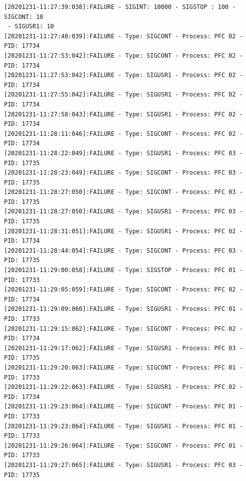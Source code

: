 \documentclass[11pt, oneside]{article}   	%
\begin{document}
\begin{Verbatim}[frame=topline,
			framesep=4mm,
			label=\fbox{\Large{FAILURE\_20201231.log}}]
[20201231-11:27:39:038]:FAILURE - SIGINT: 10000 - SIGSTOP : 100 - SIGCONT: 10
 - SIGUSR1: 10
[20201231-11:27:40:039]:FAILURE - Type: SIGCONT - Process: PFC 02 - PID: 17734
[20201231-11:27:53:042]:FAILURE - Type: SIGCONT - Process: PFC 02 - PID: 17734
[20201231-11:27:53:042]:FAILURE - Type: SIGUSR1 - Process: PFC 02 - PID: 17734
[20201231-11:27:55:042]:FAILURE - Type: SIGUSR1 - Process: PFC 02 - PID: 17734
[20201231-11:27:58:043]:FAILURE - Type: SIGUSR1 - Process: PFC 02 - PID: 17734
[20201231-11:28:11:046]:FAILURE - Type: SIGCONT - Process: PFC 02 - PID: 17734
[20201231-11:28:22:049]:FAILURE - Type: SIGUSR1 - Process: PFC 03 - PID: 17735
[20201231-11:28:23:049]:FAILURE - Type: SIGCONT - Process: PFC 03 - PID: 17735
[20201231-11:28:27:050]:FAILURE - Type: SIGCONT - Process: PFC 03 - PID: 17735
[20201231-11:28:27:050]:FAILURE - Type: SIGUSR1 - Process: PFC 03 - PID: 17735
[20201231-11:28:31:051]:FAILURE - Type: SIGUSR1 - Process: PFC 02 - PID: 17734
[20201231-11:28:44:054]:FAILURE - Type: SIGCONT - Process: PFC 03 - PID: 17735
[20201231-11:29:00:058]:FAILURE - Type: SIGSTOP - Process: PFC 01 - PID: 17733
[20201231-11:29:05:059]:FAILURE - Type: SIGCONT - Process: PFC 02 - PID: 17734
[20201231-11:29:09:060]:FAILURE - Type: SIGUSR1 - Process: PFC 01 - PID: 17733
[20201231-11:29:15:062]:FAILURE - Type: SIGCONT - Process: PFC 02 - PID: 17734
[20201231-11:29:17:062]:FAILURE - Type: SIGUSR1 - Process: PFC 03 - PID: 17735
[20201231-11:29:20:063]:FAILURE - Type: SIGCONT - Process: PFC 01 - PID: 17733
[20201231-11:29:22:063]:FAILURE - Type: SIGUSR1 - Process: PFC 02 - PID: 17734
[20201231-11:29:23:064]:FAILURE - Type: SIGCONT - Process: PFC 01 - PID: 17733
[20201231-11:29:23:064]:FAILURE - Type: SIGUSR1 - Process: PFC 01 - PID: 17733
[20201231-11:29:26:064]:FAILURE - Type: SIGCONT - Process: PFC 01 - PID: 17733
[20201231-11:29:27:065]:FAILURE - Type: SIGUSR1 - Process: PFC 03 - PID: 17735
\end{Verbatim}
\end{document}
